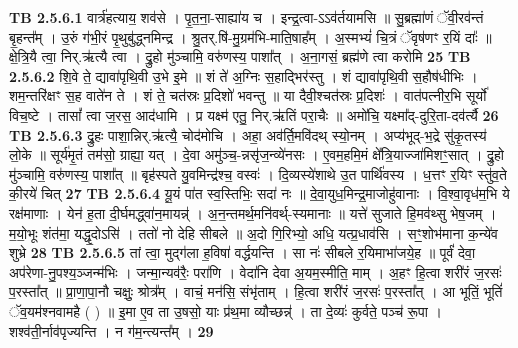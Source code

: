 \documentclass[17pt]{extarticle}
\begin{document}
                                \textbf{ TB 2.5.6.1} \newline
                  वार्त्र॑हत्याय॒ शव॑से । पृ॒त॒ना॒-साह्या॑य च । इन्द्र॒त्वा-ऽऽव॑र्तयामसि ॥ सु॒ब्रह्मा॑णं ॅवी॒रव॑न्तं बृ॒हन्त᳚म् । उ॒रुं ग॑भी॒रं पृ॒थुबु॑द्ध्नमिन्द्र । श्रु॒तर्.षि॑-मु॒ग्रम॑भि-माति॒षाह᳚म् । अ॒स्मभ्यं॑ चि॒त्रं ॅवृष॑णꣳ र॒यिं दाः᳚ ॥ क्षे॒त्रि॒यै त्वा॒ निर्.ऋ॑त्यै त्वा । द्रु॒हो मु॑ञ्चामि॒ वरु॑णस्य॒ पाशा᳚त् । अ॒ना॒गसं॒ ब्रह्म॑णे त्वा करोमि \textbf{ 25} \newline
                  \newline
                                \textbf{ TB 2.5.6.2} \newline
                  शि॒वे ते॒ द्यावा॑पृथि॒वी उ॒भे इ॒मे ॥ शं ते॑ अ॒ग्निः स॒हाद्भिर॑स्तु । शं द्यावा॑पृथि॒वी स॒हौष॑धीभिः । शम॒न्तरि॑क्षꣳ स॒ह वाते॑न ते । शं ते॒ चत॑स्रः प्र॒दिशो॑ भवन्तु ॥ या दैवी॒श्चत॑स्रः प्र॒दिशः॑ । वात॑पत्नीर॒भि सूर्यो॑ विच॒ष्टे । तासां᳚ त्वा ज॒रस॒ आद॑धामि । प्र यक्ष्म॑ एतु॒ निर्.ऋ॑तिं परा॒चैः ॥ अमो॑चि॒ यक्ष्मा᳚द्-दुरि॒ता-दव॑र्त्यै \textbf{ 26} \newline
                  \newline
                                \textbf{ TB 2.5.6.3} \newline
                  द्रु॒हः पाशा॒न्निर्.ऋ॑त्यै॒ चोद॑मोचि । अहा॒ अव॑र्ति॒मवि॑दथ् स्यो॒नम् । अप्य॑भूद्-भ॒द्रे सु॑कृ॒तस्य॑ लो॒के ॥ सूर्य॑मृ॒तं तम॑सो॒ ग्राह्या॒ यत् । दे॒वा अमु॑ञ्च॒-न्नसृ॑ज॒न्व्ये॑नसः । ए॒वम॒हमि॒मं क्षे᳚त्रि॒याज्जा॑मिशꣳ॒॒सात् । द्रु॒हो मु॑ञ्चामि॒ वरु॑णस्य॒ पाशा᳚त् ॥ बृह॑स्पते यु॒वमिन्द्र॑श्च॒ वस्वः॑ । दि॒व्यस्ये॑शाथे उ॒त पार्थि॑वस्य । ध॒त्तꣳ र॒यिꣳ स्तु॑व॒ते की॒रये॑ चित् \textbf{ 27} \newline
                  \newline
                                \textbf{ TB 2.5.6.4} \newline
                  यू॒यं पा॑त स्व॒स्तिभिः॒ सदा॑ नः ॥ दे॒वा॒युध॒मिन्द्र॒माजोहु॑वानाः । वि॒श्वा॒वृध॑म॒भि ये रक्ष॑माणाः । येन॑ ह॒ता दी॒र्घमद्ध्वा॑न॒मायन्न्॑ । अ॒न॒न्तमर्थ॒मनि॑वर्थ्-स्यमानाः ॥ यत्ते॑ सुजाते हि॒मव॑थ्सु भेष॒जम् । म॒यो॒भूः शंत॑मा॒ यद्धृ॒दोऽसि॑ । ततो॑ नो देहि सीबले ॥ अ॒दो गि॒रिभ्यो॒ अधि॒ यत्प्र॒धाव॑सि । सꣳ॒॒शोभ॑माना क॒न्ये॑व शुभ्रे \textbf{ 28} \newline
                  \newline
                                \textbf{ TB 2.5.6.5} \newline
                  तां त्वा॒ मुद्ग॑ला ह॒विषा॑ वर्द्धयन्ति । सा नः॑ सीबले र॒यिमाभा॑जये॒ह ॥ पूर्वं॑ देवा॒ अप॑रेणा-नु॒पश्य॒ञ्जन्म॑भिः । जन्मा॒न्यव॑रैः॒ परा॑णि । वेदा॑नि देवा अ॒यम॒स्मीति॒ माम् । अ॒हꣳ हि॒त्वा शरी॑रं ज॒रसः॑ प॒रस्ता᳚त् ॥ प्रा॒णा॒पा॒नौ चक्षुः॒ श्रोत्र᳚म् । वाचं॒ मन॑सि॒ संभृ॑ताम् । हि॒त्वा शरी॑रं ज॒रसः॑ प॒रस्ता᳚त् । आ भूतिं॒ भूतिं॑ ॅव॒यम॑श्नवामहै ( ) ॥ इ॒मा ए॒व ता उ॒षसो॒ याः प्र॑थ॒मा व्यौच्छन्न्॑ । ता दे॒व्यः॑ कुर्वते॒ पञ्च॑ रू॒पा । शश्व॑ती॒र्नाव॑पृज्यन्ति । न ग॑म॒न्त्यन्त᳚म् । \textbf{ 29} \newline
\end{document}
